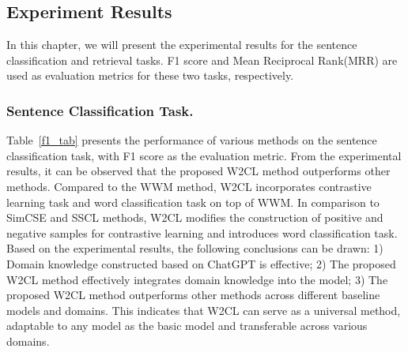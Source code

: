 \subsection{Experiment Results}
In this chapter, we will present the experimental results for the sentence classification and retrieval tasks. F1 score and Mean Reciprocal Rank(MRR) are used as evaluation metrics for these two tasks, respectively. 
\subsubsection{Sentence Classification Task.}Table~\ref{f1_tab} presents the performance of various methods on the sentence classification task, with F1 score as the evaluation metric. From the experimental results, it can be observed that the proposed W2CL method outperforms other methods. Compared to the WWM method, W2CL incorporates contrastive learning task and word classification task on top of WWM. In comparison to SimCSE and SSCL methods, W2CL modifies the construction of positive and negative samples for contrastive learning and introduces word classification task. Based on the experimental results, the following conclusions can be drawn: 1) Domain knowledge constructed based on ChatGPT is effective; 2) The proposed W2CL method effectively integrates domain knowledge into the model; 3) The proposed W2CL method outperforms other methods across different baseline models and domains. This indicates that W2CL can serve as a universal method, adaptable to any model as the basic model and transferable across various domains.

